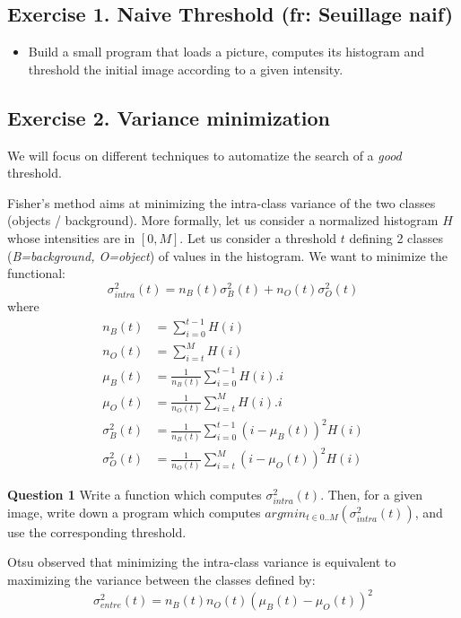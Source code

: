 \documentclass[a4paper, 11pt]{article}
\begin{document}
\subsection*{\bf Exercise 1. \rm Naive Threshold (fr: Seuillage naif)}

\begin{itemize}
	\item Build a small program that loads a picture, computes its histogram and threshold the initial image according to a given intensity.
\end{itemize}



\subsection*{\bf Exercise 2. \rm Variance minimization}

\par We will focus on different techniques to automatize the search of a \emph{good} threshold.

\par Fisher's method aims at minimizing the intra-class variance of the two classes (objects / background). More formally, let us consider a normalized histogram $H$ whose intensities are in $[0,M]$. Let us consider a threshold $t$ defining 2 classes (\emph{B=background, O=object}) of values in the histogram. We want to minimize the functional:
\begin{equation}
  \sigma^2_{intra}(t) = n_B(t)\sigma^2_B(t) + n_O(t)\sigma^2_O(t)
\end{equation}
where
\begin{align}
  n_B(t)  &= \sum_{i=0}^{t-1} H(i)\\
  n_O(t)  &= \sum_{i=t}^{M} H(i)\\
\mu_B(t) &= \frac{1}{n_B(t)} \sum_{i=0}^{t-1} H(i).i\\
\mu_O(t) &= \frac{1}{n_O(t)} \sum_{i=t}^{M} H(i).i\\
\sigma^2_B(t) &= \frac{1}{n_B(t)} \sum_{i=0}^{t-1}(i-\mu_B(t))^2 H(i)\\
\sigma^2_O(t) &= \frac{1}{n_O(t)} \sum_{i=t}^{M}(i-\mu_O(t))^2 H(i)
\end{align}


{\bf Question 1} Write a function which computes $\sigma^2_{intra}(t)$. Then, for a given image, write down a program which computes $argmin_{t\in{0..M}}(\sigma^2_{intra}(t))$, and use the corresponding threshold.

\smallskip
\par Otsu observed that minimizing the intra-class variance is equivalent to maximizing the variance between the classes defined by:
\begin{equation}
   \sigma^2_{entre}(t) = n_B(t)n_O(t)\left(\mu_B(t) - \mu_O(t) \right ) ^2
\end{equation}
\end{document}
